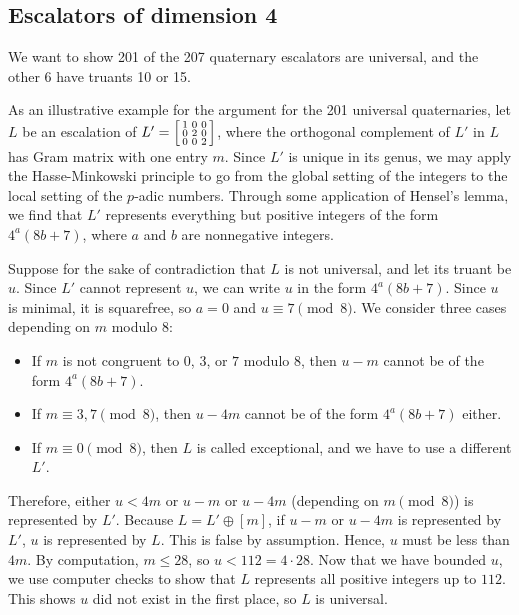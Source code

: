 \documentclass[letterpaper, 12pt]{article}
\begin{document}
\subsection{Escalators of dimension 4}
We want to show 201 of the 207 quaternary escalators are universal, and the other 6 have truants 10 or 15.

As an illustrative example for the argument for the 201 universal quaternaries, let $L$ be an escalation of $L' = \begin{bsmallmatrix} 1 & 0 & 0 \\ 0 & 2 & 0 \\ 0 & 0 & 2 \end{bsmallmatrix}$, where the orthogonal complement of $L'$ in $L$ has Gram matrix with one entry $m$. Since $L'$ is unique in its genus, we may apply the Hasse-Minkowski principle to go from the global setting of the integers to the local setting of the $p$-adic numbers. Through some application of Hensel's lemma, we find that $L'$ represents everything but positive integers of the form $4^a (8b + 7)$, where $a$ and $b$ are nonnegative integers.

Suppose for the sake of contradiction that $L$ is not universal, and let its truant be $u$. Since $L'$ cannot represent $u$, we can write $u$ in the form $4^a (8b + 7)$. Since $u$ is minimal, it is squarefree, so $a = 0$ and $u \equiv 7 \pmod 8$. We consider three cases depending on $m$ modulo $8$:
\begin{itemize}
    \item If $m$ is not congruent to $0$, $3$, or $7$ modulo $8$, then $u-m$ cannot be of the form $4^a (8b + 7)$.
    \item If $m \equiv 3, 7 \pmod 8$, then $u-4m$ cannot be of the form $4^a (8b + 7)$ either.
    \item If $m \equiv 0 \pmod 8$, then $L$ is called exceptional, and we have to use a different $L'$.
\end{itemize}

Therefore, either $u < 4m$ or $u - m$ or $u - 4m$ (depending on $m \pmod 8$) is represented by $L'$. Because $L = L' \oplus [m]$, if $u - m$ or $u - 4m$ is represented by $L'$, $u$ is represented by $L$. This is false by assumption. Hence, $u$ must be less than $4m$. By computation, $m \le 28$, so $u < 112 = 4 \cdot 28$. Now that we have bounded $u$, we use computer checks to show that $L$ represents all positive integers up to $112$. This shows $u$ did not exist in the first place, so $L$ is universal.
\end{document}
